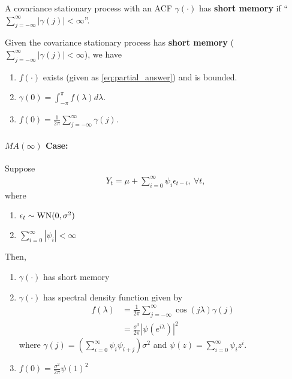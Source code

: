 \documentclass[11pt]{elegantbook}
\begin{document}
\begin{remark}
    A covariance stationary process with an ACF $\gamma(\cdot)$ has \textbf{short memory} if ``$\sum_{j=-\infty}^\infty |\gamma(j)|<\infty$''.
\end{remark}

\begin{proposition}
    Given the covariance stationary process has \textbf{short memory} ($\sum_{j=-\infty}^\infty |\gamma(j)|<\infty$), we have
    \begin{enumerate}
        \item $f(\cdot)$ exists (given as \eqref{eq:partial_answer}) and is bounded.
        \item $\gamma(0)=\int_{-\pi}^\pi f(\lambda) d \lambda$.
        \item $f(0)=\frac{1}{2\pi}\sum_{j=-\infty}^\infty \gamma(j)$.
    \end{enumerate}
\end{proposition}

\paragraph*{$MA(\infty)$ Case:}
Suppose
\begin{equation}
    \begin{aligned}
        Y_t=\mu+\sum_{i=0}^\infty \psi_i\epsilon_{t-i},\ \forall t,
    \end{aligned}
    \nonumber
\end{equation}
where
\begin{enumerate}[$\cdot$]
    \item $\epsilon_t\sim \textnormal{WN}(0,\sigma^2)$
    \item $\sum_{i=0}^\infty |\psi_i|<\infty$
\end{enumerate}
Then,
\begin{enumerate}[$\circ$]
    \item $\gamma(\cdot)$ has short memory
    \item $\gamma(\cdot)$ has spectral density function given by
    \begin{equation}
        \begin{aligned}
            f(\lambda)&=\frac{1}{2\pi}\sum_{j=-\infty}^\infty \cos\left(j\lambda\right)\gamma(j)\\
            &=\frac{\sigma^2}{2\pi}|\psi(e^{i\lambda})|^2
        \end{aligned}
        \nonumber
    \end{equation}
    where $\gamma(j)=(\sum_{i=0}^\infty \psi_i\psi_{i+j})\sigma^2$ and $\psi(z)=\sum_{i=0}^\infty \psi_iz^i$.
    \item $f(0)=\frac{\sigma^2}{2\pi}\psi(1)^2$
\end{enumerate}
\end{document}

